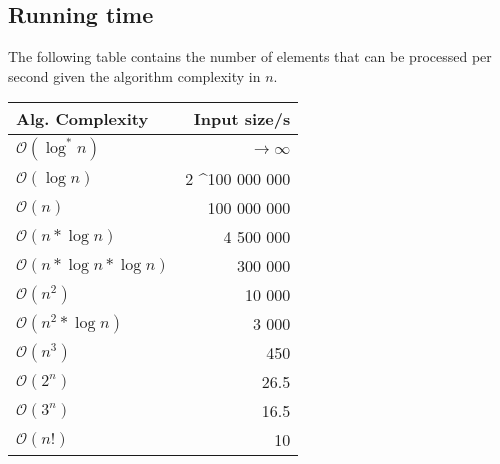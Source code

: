\documentclass[8pt,a4paper,landscape,oneside]{amsart}
\newcommand{\bigO}{\mathcal{O}}
\begin{document}
\begin{multicols*}{3}
        
\section{Running time}
The following table contains the number of elements that can be processed per second given the algorithm complexity in $n$.
\begin{center}
\begin{tabular}{lr}
Alg. Complexity & Input size/s \\ \hline
$\bigO(\log^*{n})$   & $\rightarrow \infty$ \\
$\bigO(\log{n})$     & 2 \textasciicircum 100 000 000 \\
$\bigO(n)$           & 100 000 000 \\
$\bigO(n*\log{n})$   & 4 500 000 \\
$\bigO(n*\log{n}*\log{n})$ & 300 000 \\
$\bigO(n^2)$         & 10 000 \\
$\bigO(n^2*\log{n})$ & 3 000 \\
$\bigO(n^3)$         & 450 \\
$\bigO(2^n)$         & 26.5 \\
$\bigO(3^n)$         & 16.5 \\
$\bigO(n!)$          & 10
\end{tabular}
\end{center}



\end{multicols*}
\end{document}
